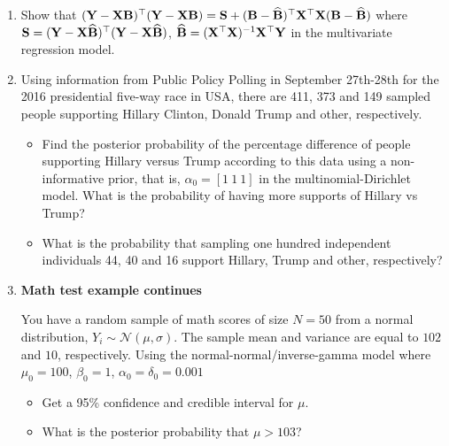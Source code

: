 \begin{enumerate}
	\item Show that $({\bf{Y}}-{\bf{X}}{\bf{B}})^{\top}({\bf{Y}}-{\bf{X}}{\bf{B}})={\bf{S}}+({\bf{B}}-\widehat{\bf{B}})^{\top}{\bf{X}}^{\top}{\bf{X}}({\bf{B}}-\widehat{\bf{B}})$ where ${\bf{S}}= ({\bf{Y}}-{\bf{X}}\widehat{\bf{B}})^{\top}({\bf{Y}}-{\bf{X}}\widehat{\bf{B}})$, $\widehat{\bf{B}}= ({\bf{X}}^{\top}{\bf{X}})^{-1}{\bf{X}}^{\top}{\bf{Y}}$ in the multivariate regression model.
	
	\item Using information from Public Policy Polling in September 27th-28th for the 2016 presidential five-way race in USA, there are 411, 373 and 149 sampled people supporting Hillary Clinton, Donald Trump and other, respectively. 
	
	\begin{itemize}
		\item Find the posterior probability of the percentage difference of people supporting Hillary versus Trump according to this data using a non-informative prior, that is, $\alpha_0=[1 \ 1 \ 1]$ in the multinomial-Dirichlet model. What is the probability of having more supports of Hillary vs Trump?
		
		\item What is the probability that sampling one hundred independent individuals 44, 40 and 16 support Hillary, Trump and other, respectively?  
	\end{itemize}

\item \textbf{Math test example continues}

You have a random sample of math scores of size $N=50$ from a normal distribution, $Y_i\sim \mathcal{N}(\mu, \sigma)$. The sample mean and variance are equal to $102$ and $10$, respectively. Using the normal-normal/inverse-gamma model where $\mu_0=100$, $\beta_0=1$, $\alpha_0=\delta_0=0.001$

\begin{itemize}
	\item Get a 95\% confidence and credible interval for $\mu$.
	\item What is the posterior probability that $\mu > 103$?  
\end{itemize} 



\end{enumerate}
